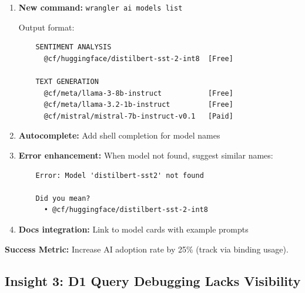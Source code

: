 \documentclass[11pt,a4paper]{article}
\begin{document}
\begin{enumerate}[leftmargin=*, itemsep=0.5em]
    \item \textbf{New command:} \texttt{wrangler ai models list}
    
    Output format:
    \begin{verbatim}
    SENTIMENT ANALYSIS
      @cf/huggingface/distilbert-sst-2-int8  [Free]
      
    TEXT GENERATION
      @cf/meta/llama-3-8b-instruct           [Free]
      @cf/meta/llama-3.2-1b-instruct         [Free]
      @cf/mistral/mistral-7b-instruct-v0.1   [Paid]
    \end{verbatim}
    
    \item \textbf{Autocomplete:} Add shell completion for model names
    
    \item \textbf{Error enhancement:} When model not found, suggest similar names:
    \begin{verbatim}
    Error: Model 'distilbert-sst2' not found
    
    Did you mean?
      • @cf/huggingface/distilbert-sst-2-int8
    \end{verbatim}
    
    \item \textbf{Docs integration:} Link to model cards with example prompts
\end{enumerate}

\textbf{Success Metric:} Increase AI adoption rate by 25\% (track via binding usage).

\newpage

\subsection{Insight 3: D1 Query Debugging Lacks Visibility}
\end{document}
